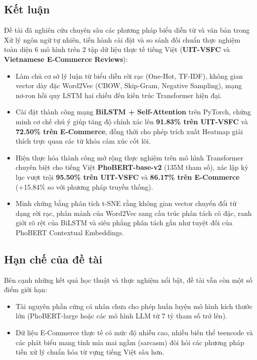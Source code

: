 \documentclass[12pt,a4paper]{article}
\begin{document}
\subsection{Kết luận}\label{sec:conclusion}
Đề tài đã nghiên cứu chuyên sâu các phương pháp biểu diễn từ và văn bản trong Xử lý ngôn ngữ tự nhiên, tiến hành cài đặt và so sánh đối chuẩn thực nghiệm toàn diện 6 mô hình trên 2 tập dữ liệu thực tế tiếng Việt (\textbf{UIT-VSFC} và \textbf{Vietnamese E-Commerce Reviews}):
\begin{itemize}[leftmargin=1.0cm, itemsep=2pt]
    \item[--] Làm chủ cơ sở lý luận từ biểu diễn rời rạc (One-Hot, TF-IDF), không gian vector dày đặc Word2Vec (CBOW, Skip-Gram, Negative Sampling), mạng nơ-ron hồi quy LSTM hai chiều đến kiến trúc Transformer hiện đại.
    \item[--] Cài đặt thành công mạng \textbf{BiLSTM + Self-Attention} trên PyTorch, chứng minh cơ chế chú ý giúp tăng độ chính xác lên \textbf{91.83\% trên UIT-VSFC} và \textbf{72.50\% trên E-Commerce}, đồng thời cho phép trích xuất Heatmap giải thích trực quan các từ khóa cảm xúc cốt lõi.
    \item[--] Hiện thực hóa thành công mở rộng thực nghiệm trên mô hình Transformer chuyên biệt cho tiếng Việt \textbf{PhoBERT-base-v2} (135M tham số), xác lập kỷ lục vượt trội \textbf{95.50\% trên UIT-VSFC} và \textbf{86.17\% trên E-Commerce} (+15.84\% so với phương pháp truyền thống).
    \item[--] Minh chứng bằng phân tích t-SNE rằng không gian vector chuyển đổi từ dạng rời rạc, phân mảnh của Word2Vec sang cấu trúc phân tách cô đặc, ranh giới rõ rệt của BiLSTM và siêu phẳng phân tách gần như tuyệt đối của PhoBERT Contextual Embeddings.
\end{itemize}

\subsection{Hạn chế của đề tài}\label{sec:limitations}
Bên cạnh những kết quả học thuật và thực nghiệm nổi bật, đề tài vẫn còn một số điểm giới hạn:
\begin{itemize}[leftmargin=1.0cm, itemsep=2pt]
    \item[--] Tài nguyên phần cứng cá nhân chưa cho phép huấn luyện mô hình kích thước lớn (PhoBERT-large hoặc các mô hình LLM từ 7 tỷ tham số trở lên).
    \item[--] Dữ liệu E-Commerce thực tế có mức độ nhiễu cao, nhiều biến thể teencode và các phát biểu mang tính mỉa mai ngầm (sarcasm) đòi hỏi các phương pháp tiền xử lý chuẩn hóa từ vựng tiếng Việt sâu hơn.
\end{itemize}
\end{document}
